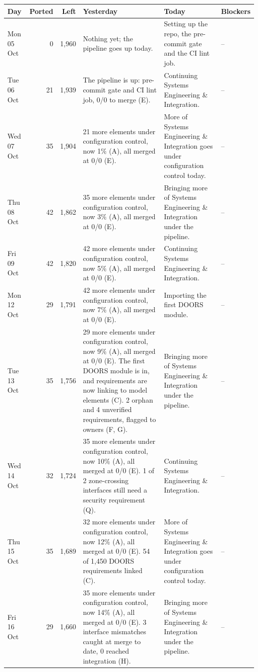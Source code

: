\documentclass[12pt,letterpaper,oneside]{article}
\newcommand{\figfont}{\fontsize{9}{11}\selectfont}   %
\begin{document}
{\figfont\setlength{\tabcolsep}{4pt}\renewcommand{\arraystretch}{1.15}
\begin{longtable}{@{}>{\raggedright}p{} r r >{\raggedright}p{} >{\raggedright}p{} >{\raggedright\arraybackslash}p{}@{}}
\toprule
Day & Ported & Left & Yesterday & Today & Blockers \\
\midrule
\endhead
\bottomrule
\endfoot
Mon 05 Oct & 0 & 1,960 & Nothing yet; the pipeline goes up today. & Setting up the repo, the pre-commit gate and the CI lint job. & -- \\
Tue 06 Oct & 21 & 1,939 & The pipeline is up: pre-commit gate and CI lint job, 0/0 to merge (E). & Continuing Systems Engineering \& Integration. & -- \\
Wed 07 Oct & 35 & 1,904 & 21 more elements under configuration control, now 1\% (A), all merged at 0/0 (E). & More of Systems Engineering \& Integration goes under configuration control today. & -- \\
Thu 08 Oct & 42 & 1,862 & 35 more elements under configuration control, now 3\% (A), all merged at 0/0 (E). & Bringing more of Systems Engineering \& Integration under the pipeline. & -- \\
Fri 09 Oct & 42 & 1,820 & 42 more elements under configuration control, now 5\% (A), all merged at 0/0 (E). & Continuing Systems Engineering \& Integration. & -- \\
Mon 12 Oct & 29 & 1,791 & 42 more elements under configuration control, now 7\% (A), all merged at 0/0 (E). & Importing the first DOORS module. & -- \\
Tue 13 Oct & 35 & 1,756 & 29 more elements under configuration control, now 9\% (A), all merged at 0/0 (E). The first DOORS module is in, and requirements are now linking to model elements (C). 2 orphan and 4 unverified requirements, flagged to owners (F, G). & Bringing more of Systems Engineering \& Integration under the pipeline. & -- \\
Wed 14 Oct & 32 & 1,724 & 35 more elements under configuration control, now 10\% (A), all merged at 0/0 (E). 1 of 2 zone-crossing interfaces still need a security requirement (Q). & Continuing Systems Engineering \& Integration. & -- \\
Thu 15 Oct & 35 & 1,689 & 32 more elements under configuration control, now 12\% (A), all merged at 0/0 (E). 54 of 1,450 DOORS requirements linked (C). & More of Systems Engineering \& Integration goes under configuration control today. & -- \\
Fri 16 Oct & 29 & 1,660 & 35 more elements under configuration control, now 14\% (A), all merged at 0/0 (E). 3 interface mismatches caught at merge to date, 0 reached integration (H). & Bringing more of Systems Engineering \& Integration under the pipeline. & -- \\
\end{longtable}}
\end{document}
